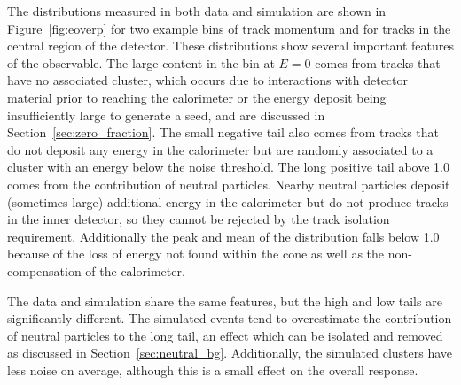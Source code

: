 The \ep distributions measured in both data and simulation are shown in Figure~\ref{fig:eoverp} for two example bins of track momentum and for tracks in the central region of the detector. 
These distributions show several important features of the \ep observable.
The large content in the bin at $E=0$ comes from tracks that have no associated cluster, which occurs due to interactions with detector material prior to reaching the calorimeter or the energy deposit being insufficiently large to generate a seed, and are discussed in Section~\ref{sec:zero_fraction}.
The small negative tail also comes from tracks that do not deposit any energy in the calorimeter but are randomly associated to a cluster with an energy below the noise threshold.
The long positive tail above 1.0 comes from the contribution of neutral particles.
Nearby neutral particles deposit (sometimes large) additional energy in the calorimeter but do not produce tracks in the inner detector, so they cannot be rejected by the track isolation requirement.
Additionally the peak and mean of the distribution falls below 1.0 because of the loss of energy not found within the cone as well as the non-compensation of the calorimeter.

The data and simulation share the same features, but the high and low tails are significantly different.
The simulated events tend to overestimate the contribution of neutral particles to the long tail, an effect which can be isolated and removed as discussed in Section~\ref{sec:neutral_bg}. 
Additionally, the simulated clusters have less noise on average, although this is a small effect on the overall response.

